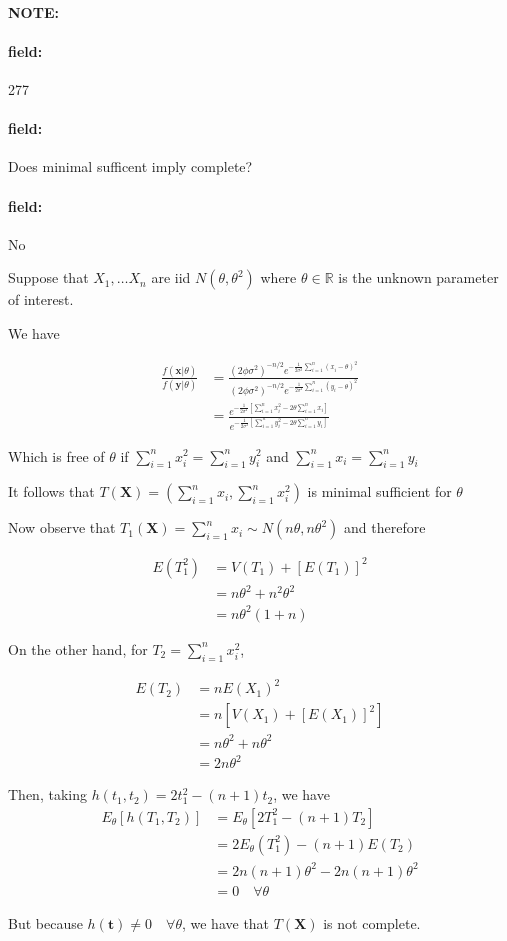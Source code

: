\documentclass[12pt]{article}
\newenvironment{note}{\paragraph{NOTE:}}{}
\newenvironment{field}{\paragraph{field:}}{}
\begin{document}
\begin{note} \begin{field} \tiny 277 \end{field}
  \begin{field}
    Does minimal sufficent imply complete?
  \end{field}
  \begin{field}
    No

    Suppose that $X_1, \ldots X_n$ are iid $N(\theta,\theta^2)$ where $\theta \in \mathbb{R}$ is the unknown parameter of interest.

    We have

    \begin{align*}
      \frac{f(\mathbf{x}|\theta)}{f(\mathbf{y}|\theta)}
      &= \frac{(2\phi\sigma^2)^{-n/2}e^{-\frac{1}{2\sigma^2}\sum_{i =1}^n (x_i -\theta)^2}}{(2\phi\sigma^2)^{-n/2}e^{-\frac{1}{2\sigma^2}\sum_{i =1}^n (y_i -\theta)^2}}\\
      &= \frac{e^{-\frac{1}{2\sigma^2}[\sum _{i = 1}^n x_i^2 - 2\theta \sum _{i = 1}^n x_i]}}{e^{-\frac{1}{2\sigma^2}[\sum _{i = 1}^n y_i^2 - 2\theta \sum _{i = 1}^n y_i]}}
    \end{align*}

    Which is free of $\theta$ if $\sum _{i = 1}^n x_i^2 = \sum _{i = 1}^n y_i^2$ and $\sum _{i = 1}^n x_i = \sum _{i = 1}^n y_i$

    It follows that $T(\mathbf{X}) = (\sum _{i = 1}^n x_i, \sum _{i = 1}^n x_i^2)$ is minimal sufficient for $\theta$

    Now observe that $T_1(\mathbf{X}) = \sum _{i = 1}^n x_i \sim N(n\theta, n\theta^2)$ and therefore

    \begin{align*}
      E(T_1^2) &= V(T_1) + [E(T_1)]^2\\
      &= n\theta^2 + n^2\theta^2\\
      &= n\theta^2(1 + n)
    \end{align*}

    On the other hand, for $T_2 = \sum _{i = 1}^n x_i^2$,

    \begin{align*}
      E(T_2) &= n E(X_1)^2\\
      &= n[V(X_1) + [E(X_1)]^2]\\
      &= n\theta^2 + n\theta^2\\
      &= 2n\theta^2
    \end{align*}

    Then, taking $h(t_1,t_2) = 2t_1^2 - (n+1)t_2$, we have
    \begin{align*}
      E_\theta[h(T_1,T_2)] &= E_\theta[2T_1^2 - (n+1)T_2]\\
      &= 2E_\theta(T_1^2) - (n+1)E(T_2)\\
      &= 2n(n+1)\theta^2 - 2n(n+1)\theta^2\\
      &= 0 \quad \forall \theta
    \end{align*}

    But because $h(\mathbf{t}) \neq 0 \quad \forall \theta$, we have that $T(\mathbf{X})$ is not complete.
  \end{field}
\end{note}
\end{document}
